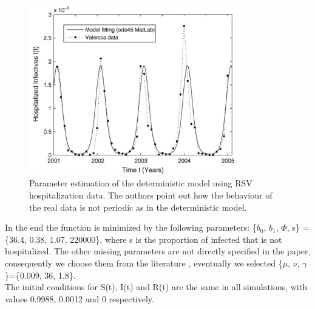  \begin{figure}[h!]
  \centering
  \includegraphics[width=0.8\textwidth]{IMG/det_fitting.png}
  \caption{Parameter estimation of the deterministic model using RSV hospitalization data. The authors point out how the behaviour of the real data is not periodic as in the deterministic model.}
  \label{fig:det_fitting}
\end{figure}

 In the end the function is minimized by the following parameters: \{$b_{0}$, $b_{1}$, $\Phi$, s\} = \{36.4, 0.38, 1.07, 220000\}, where s is the proportion of infected that is not hospitalized.
 The other missing parameters are not directly specified in the paper, consequently we choose them from the literature \cite{weber}, eventually we selected \{$\mu$, $\nu$, $\gamma$\}=\{0.009, 36, 1,8\}. \\
 The initial conditions for S(t), I(t) and R(t) are the same in all simulations, with values 0.9988, 0.0012 and 0 respectively. 